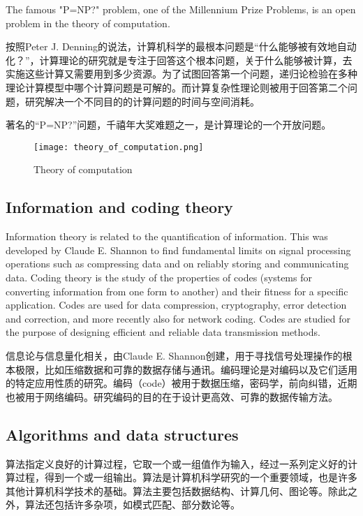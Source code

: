 The famous "P=NP?" problem, one of the Millennium Prize Problems, is an open problem in the theory of computation.


按照Peter J. Denning的说法，计算机科学的最根本问题是“什么能够被有效地自动化？”，计算理论的研究就是专注于回答这个根本问题，关于什么能够被计算，去实施这些计算又需要用到多少资源。为了试图回答第一个问题，递归论检验在多种理论计算模型中哪个计算问题是可解的。而计算复杂性理论则被用于回答第二个问题，研究解决一个不同目的的计算问题的时间与空间消耗。

著名的“P=NP?”问题，千禧年大奖难题之一，是计算理论的一个开放问题。


\begin{figure}[!h]
\centering
\texttt{[image: theory\_of\_computation.png]}
\caption{Theory of computation}
\label{theory_of_computation}
\end{figure}




\subsection{Information and coding theory}

Information theory is related to the quantification of information. This was developed by Claude E. Shannon to find fundamental limits on signal processing operations such as compressing data and on reliably storing and communicating data. Coding theory is the study of the properties of codes (systems for converting information from one form to another) and their fitness for a specific application. Codes are used for data compression, cryptography, error detection and correction, and more recently also for network coding. Codes are studied for the purpose of designing efficient and reliable data transmission methods.


信息论与信息量化相关，由Claude E. Shannon创建，用于寻找信号处理操作的根本极限，比如压缩数据和可靠的数据存储与通讯。编码理论是对编码以及它们适用的特定应用性质的研究。编码（code）被用于数据压缩，密码学，前向纠错，近期也被用于网络编码。研究编码的目的在于设计更高效、可靠的数据传输方法。




\subsection{Algorithms and data structures}

算法指定义良好的计算过程，它取一个或一组值作为输入，经过一系列定义好的计算过程，得到一个或一组输出。算法是计算机科学研究的一个重要领域，也是许多其他计算机科学技术的基础。算法主要包括数据结构、计算几何、图论等。除此之外，算法还包括许多杂项，如模式匹配、部分数论等。

